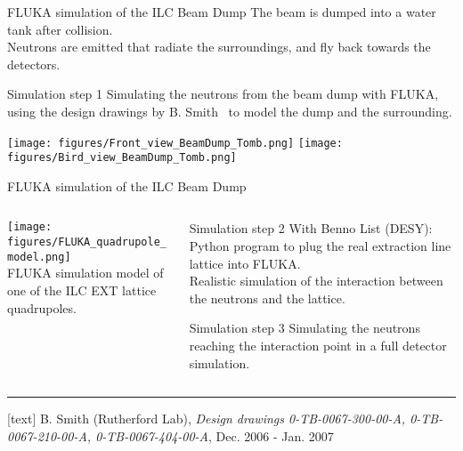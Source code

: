 {
\begin{frame}{FLUKA simulation of the ILC Beam Dump}
\flukalogo
The beam is dumped into a water tank after collision.\\Neutrons are emitted that radiate the surroundings, and fly back towards the detectors.
\begin{block}{Simulation step 1}
Simulating the neutrons from the beam dump with FLUKA, using the design drawings by B. Smith~\cite{Smith} to model the dump and the surrounding.
\end{block}

\begin{center}
\texttt{[image: figures/Front\_view\_BeamDump\_Tomb.png]}
\hspace*{0.2cm}
\texttt{[image: figures/Bird\_view\_BeamDump\_Tomb.png]}
\end{center}
\end{frame}

\begin{frame}{FLUKA simulation of the ILC Beam Dump}
\flukalogo
\begin{columns}
\begin{column}[c]{0.4\textwidth}
\texttt{[image: figures/FLUKA\_quadrupole\_model.png]}\\
\small FLUKA simulation model of one of the ILC EXT lattice quadrupoles.
\end{column}
\begin{column}[c]{0.55\textwidth}
\begin{block}{Simulation step 2}
With Benno List (DESY): Python program to plug the real extraction line lattice into FLUKA.\\
Realistic simulation of the interaction between the neutrons and the lattice.
\end{block}
\begin{block}{Simulation step 3}
Simulating the neutrons reaching the interaction point in a full detector simulation.
\end{block}
\end{column}
\end{columns}
\vspace*{0.3cm}
\rule{12cm}{.1pt}
\begin{thebibliography}{9}
[text]
 B. Smith (Rutherford Lab), \emph{Design drawings 0-TB-0067-300-00-A, 0-TB-0067-210-00-A, 0-TB-0067-404-00-A}, Dec. 2006 - Jan. 2007
\end{thebibliography}
\end{frame}
}

